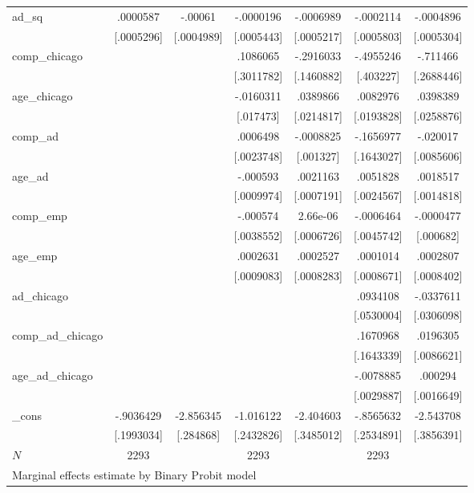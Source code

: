 \begin{tabular}{l*{6}{c}}
ad\_sq       &    .0000587&     -.00061&   -.0000196&   -.0006989&   -.0002114&   -.0004896\\
            &  [.0005296]&  [.0004989]&  [.0005443]&  [.0005217]&  [.0005803]&  [.0005304]\\
comp\_chicago&            &            &    .1086065&   -.2916033&   -.4955246&    -.711466\\
            &            &            &  [.3011782]&  [.1460882]&   [.403227]&  [.2688446]\\
age\_chicago &            &            &   -.0160311&    .0389866&    .0082976&    .0398389\\
            &            &            &   [.017473]&  [.0214817]&  [.0193828]&  [.0258876]\\
comp\_ad     &            &            &    .0006498&   -.0008825&   -.1656977&    -.020017\\
            &            &            &  [.0023748]&   [.001327]&  [.1643027]&  [.0085606]\\
age\_ad      &            &            &    -.000593&    .0021163&    .0051828&    .0018517\\
            &            &            &  [.0009974]&  [.0007191]&  [.0024567]&  [.0014818]\\
comp\_emp    &            &            &    -.000574&    2.66e-06&   -.0006464&   -.0000477\\
            &            &            &  [.0038552]&  [.0006726]&  [.0045742]&   [.000682]\\
age\_emp     &            &            &    .0002631&    .0002527&    .0001014&    .0002807\\
            &            &            &  [.0009083]&  [.0008283]&  [.0008671]&  [.0008402]\\
ad\_chicago  &            &            &            &            &    .0934108&   -.0337611\\
            &            &            &            &            &  [.0530004]&  [.0306098]\\
comp\_ad\_chicago&            &            &            &            &    .1670968&    .0196305\\
            &            &            &            &            &  [.1643339]&  [.0086621]\\
age\_ad\_chicago&            &            &            &            &   -.0078885&     .000294\\
            &            &            &            &            &  [.0029887]&  [.0016649]\\
\_cons      &   -.9036429&   -2.856345&   -1.016122&   -2.404603&   -.8565632&   -2.543708\\
            &  [.1993034]&   [.284868]&  [.2432826]&  [.3485012]&  [.2534891]&  [.3856391]\\
\(N\)       &        2293&            &        2293&            &        2293&            \\
\multicolumn{7}{l}{\footnotesize  Marginal effects estimate by Binary Probit model}\\
\end{tabular}
